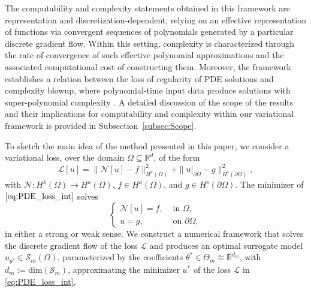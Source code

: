 \documentclass[pdflatex]{sn-jnl}%
\begin{document}
The computability and complexity statements obtained in this framework are representation and discretization-dependent, relying on an effective representation of functions via convergent sequences of polynomials generated by a particular discrete gradient flow. Within this setting, complexity is characterized through the rate of convergence of such effective polynomial approximations and the associated computational cost of constructing them. Moreover, the framework establishes a relation between the loss of regularity of PDE solutions and complexity blowup, where polynomial-time input data produce solutions with super-polynomial complexity \cite{bacho2023complexityblowupsolutionslaplace}. A detailed discussion of the scope of the results and their implications for computability and complexity within our variational framework is provided in Subsection~\ref{subsec:Scope}.

To sketch the main idea of the method presented in this paper, we consider a variational loss, over the domain $\Omega\subseteq \mathbb{R}^d$, of the form
\begin{equation}\label{eq:PDE_loss_int}
\mathcal{L}[u] = \| \mathcal{N}[u] - f\|_{H^a(\Omega)}^2 + \|u|_{\partial\Omega} - g\|_{H^s(\partial\Omega)}^2,
\end{equation}
with $\mathcal{N}:H^k(\Omega)\rightarrow H^a(\Omega)$, $f\in H^a(\Omega)$, and $g\in H^s(\partial\Omega)$. The minimizer of $\eqref{eq:PDE_loss_int}$ solves 
\begin{equation}\label{eq:gen_pde_int}
\left\{\begin{array}{cc}
       \mathcal{N}[u] = f,&\textrm{ in }\Omega, \\
      u= g,&\textrm{ on } \partial\Omega,
\end{array}\right.
\end{equation}
in either a strong or weak sense. We construct a numerical framework that solves the discrete gradient flow of the loss $\mathcal{L}$ and produces an optimal surrogate model $\hat{u}_{\theta^*}\in \mathcal{S}_m(\Omega)$, parameterized by the coefficients $\theta^*\in \Theta_m\cong \mathbb{R}^{d_m}$, with $d_m:=\textrm{dim}(\mathcal{S}_m)$, approximating the minimizer $u^*$ of the loss $\mathcal{L}$ in \eqref{eq:PDE_loss_int}.
\end{document}
